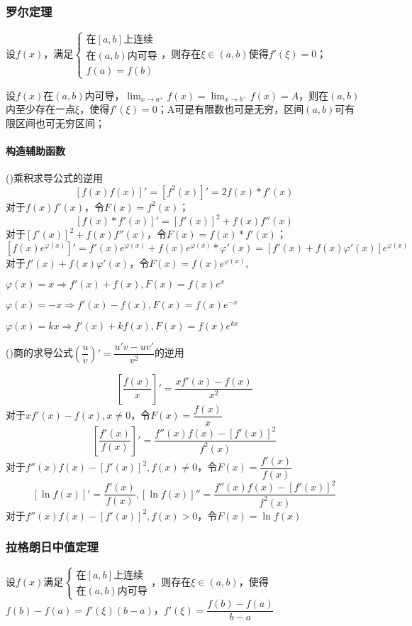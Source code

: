 \subsubsection{罗尔定理}
设\(f(x)\)，满足\(\begin{cases}
\text{在}[a, b]\text{上连续} \\ 
\text{在}(a, b)\text{内可导} \\ 
f(a) = f(b)
\end{cases}\)，则存在\(\xi \in (a, b)\)使得\(f'(\xi) = 0\)；

设\(f(x)\)在\((a, b)\)内可导，\(\displaystyle\lim_{x \to a^+}f(x) = \lim_{x \to b^-}f(x) = A\)，则在\((a, b)\)内至少存在一点\(\xi\)，使得\(f'(\xi) = 0\)；A可是有限数也可是无穷，区间\((a, b)\)可有限区间也可无穷区间；\textbf{}

\paragraph{构造辅助函数}
()乘积求导公式的逆用
\[[f(x)f(x)]' = [f^2(x)]' = 2f(x) * f'(x)\]
对于\(f(x)f'(x)\)，令\(F(x) = f^2(x)\)；
\[[f(x) * f'(x)]' = [f'(x)]^2 + f(x)f''(x)\]
对于\([f'(x)]^2 + f(x)f''(x)\)，令\(F(x) = f(x) * f'(x)\)；
\[[f(x)e^{\varphi(x)}]' = f'(x)e^{\varphi(x)} + f(x)e^{\varphi(x)} * \varphi'(x) = [f'(x) + f(x)\varphi'(x)]e^{\varphi(x)}\]
对于\(f'(x) + f(x)\varphi'(x)\)，令\(F(x) = f(x)e^{\varphi(x)}\),

\(\varphi(x) = x \Rightarrow f'(x) + f(x), F(x) = f(x)e^x\)

\(\varphi(x) = -x \Rightarrow f'(x) - f(x), F(x) = f(x)e^{-x}\)

\(\varphi(x) = kx \Rightarrow f'(x) + kf(x), F(x) = f(x)e^{kx}\)

()商的求导公式\((\dfrac{u}{v})' = \dfrac{u'v - uv'}{v^2}\)的逆用

\[[\dfrac{f(x)}{x}]' = \dfrac{xf'(x) - f(x)}{x^2}\]
对于\(xf'(x) - f(x), x \neq 0\)，令\(F(x) = \dfrac{f(x)}{x}\)
\[[\dfrac{f'(x)}{f(x)}]' = \dfrac{f''(x)f(x) - [f'(x)]^2}{f^2(x)}\]
对于\(f''(x)f(x) - [f'(x)]^2, f(x) \neq 0\)，令\(F(x) = \dfrac{f'(x)}{f(x)}\)
\[[\ln f(x)]' = \dfrac{f'(x)}{f(x)}, [\ln f(x)]'' = \dfrac{f''(x)f(x) - [f'(x)]^2}{f^2(x)}\]
对于\(f''(x)f(x) - [f'(x)]^2, f(x) > 0\)，令\(F(x) = \ln f(x)\)

\subsubsection{拉格朗日中值定理}
设\(f(x)\)满足\(\begin{cases}
\text{在}[a, b]\text{上连续} \\ 
\text{在}(a, b)\text{内可导}
\end{cases}\)，则存在\(\xi \in (a, b)\)，使得\(f(b) - f(a) = f'(\xi)(b - a)\)，\(f'(\xi) = \dfrac{f(b) - f(a)}{b - a}\)

